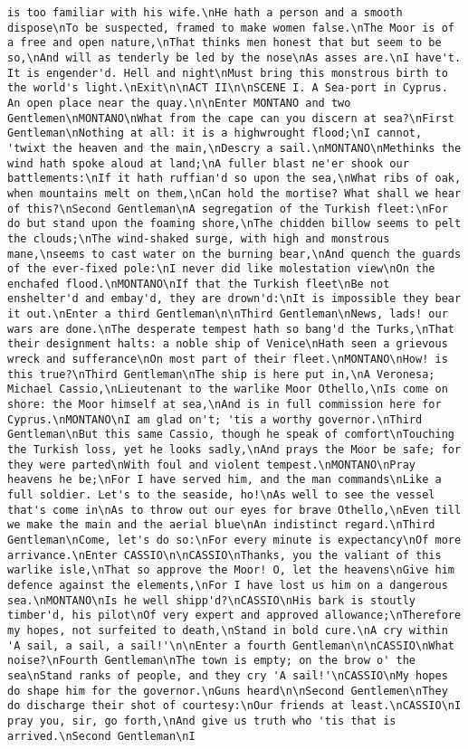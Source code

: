\begin{verbatim}
is too familiar with his wife.\nHe hath a person and a smooth dispose\nTo be suspected, framed to make women false.\nThe Moor is of a free and open nature,\nThat thinks men honest that but seem to be so,\nAnd will as tenderly be led by the nose\nAs asses are.\nI have't. It is engender'd. Hell and night\nMust bring this monstrous birth to the world's light.\nExit\n\nACT II\n\nSCENE I. A Sea-port in Cyprus. An open place near the quay.\n\nEnter MONTANO and two Gentlemen\nMONTANO\nWhat from the cape can you discern at sea?\nFirst Gentleman\nNothing at all: it is a highwrought flood;\nI cannot, 'twixt the heaven and the main,\nDescry a sail.\nMONTANO\nMethinks the wind hath spoke aloud at land;\nA fuller blast ne'er shook our battlements:\nIf it hath ruffian'd so upon the sea,\nWhat ribs of oak, when mountains melt on them,\nCan hold the mortise? What shall we hear of this?\nSecond Gentleman\nA segregation of the Turkish fleet:\nFor do but stand upon the foaming shore,\nThe chidden billow seems to pelt the clouds;\nThe wind-shaked surge, with high and monstrous mane,\nseems to cast water on the burning bear,\nAnd quench the guards of the ever-fixed pole:\nI never did like molestation view\nOn the enchafed flood.\nMONTANO\nIf that the Turkish fleet\nBe not enshelter'd and embay'd, they are drown'd:\nIt is impossible they bear it out.\nEnter a third Gentleman\n\nThird Gentleman\nNews, lads! our wars are done.\nThe desperate tempest hath so bang'd the Turks,\nThat their designment halts: a noble ship of Venice\nHath seen a grievous wreck and sufferance\nOn most part of their fleet.\nMONTANO\nHow! is this true?\nThird Gentleman\nThe ship is here put in,\nA Veronesa; Michael Cassio,\nLieutenant to the warlike Moor Othello,\nIs come on shore: the Moor himself at sea,\nAnd is in full commission here for Cyprus.\nMONTANO\nI am glad on't; 'tis a worthy governor.\nThird Gentleman\nBut this same Cassio, though he speak of comfort\nTouching the Turkish loss, yet he looks sadly,\nAnd prays the Moor be safe; for they were parted\nWith foul and violent tempest.\nMONTANO\nPray heavens he be;\nFor I have served him, and the man commands\nLike a full soldier. Let's to the seaside, ho!\nAs well to see the vessel that's come in\nAs to throw out our eyes for brave Othello,\nEven till we make the main and the aerial blue\nAn indistinct regard.\nThird Gentleman\nCome, let's do so:\nFor every minute is expectancy\nOf more arrivance.\nEnter CASSIO\n\nCASSIO\nThanks, you the valiant of this warlike isle,\nThat so approve the Moor! O, let the heavens\nGive him defence against the elements,\nFor I have lost us him on a dangerous sea.\nMONTANO\nIs he well shipp'd?\nCASSIO\nHis bark is stoutly timber'd, his pilot\nOf very expert and approved allowance;\nTherefore my hopes, not surfeited to death,\nStand in bold cure.\nA cry within 'A sail, a sail, a sail!'\n\nEnter a fourth Gentleman\n\nCASSIO\nWhat noise?\nFourth Gentleman\nThe town is empty; on the brow o' the sea\nStand ranks of people, and they cry 'A sail!'\nCASSIO\nMy hopes do shape him for the governor.\nGuns heard\n\nSecond Gentlemen\nThey do discharge their shot of courtesy:\nOur friends at least.\nCASSIO\nI pray you, sir, go forth,\nAnd give us truth who 'tis that is arrived.\nSecond Gentleman\nI 
\end{verbatim}
